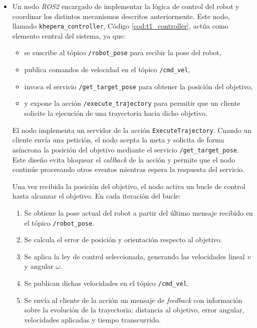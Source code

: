 \begin{itemize}
    Para realizar la solicitud de la acción desde terminal, 
    ejecutar el Código \ref{cod:actionClient}. En dicho código 
    aparece tanto la llamada indicando una posición como sin indicarla, en 
    la que es suficiente con establecer el valor de cualquiera de los campos 
    a ``nan'' para que obtenga mediante el servicio la posición del objeto como punto de destino.

    \item Un nodo \textit{ROS2} encargado de implementar la lógica de control del robot y 
coordinar los distintos mecanismos descritos anteriormente. Este nodo, llamado 
\texttt{khepera\_controller}, Código \ref{cod:t1_controller}, actúa como elemento central del sistema, ya que:

\begin{itemize}
    \item se suscribe al tópico \texttt{/robot\_pose} para recibir la pose del robot,
    \item publica comandos de velocidad en el tópico \texttt{/cmd\_vel},
    \item invoca el servicio \texttt{/get\_target\_pose} para obtener la posición del objetivo,
    \item y expone la acción \texttt{/execute\_trajectory} para permitir que un cliente
    solicite la ejecución de una trayectoria hacia dicho objetivo.
\end{itemize}

El nodo implementa un servidor de la acción \texttt{ExecuteTrajectory}. Cuando un 
cliente envía una petición, el nodo acepta la meta y solicita de forma asíncrona 
la posición del objetivo mediante el servicio \texttt{/get\_target\_pose}. Este 
diseño evita bloquear el \textit{callback} de la acción y permite que el nodo 
continúe procesando otros eventos mientras espera la respuesta del servicio.

Una vez recibida la posición del objetivo, el nodo activa un bucle de control 
hasta alcanzar el objetivo. En cada iteración del bucle:

\begin{enumerate}
    \item Se obtiene la pose actual del robot a partir del último mensaje recibido 
    en el tópico \texttt{/robot\_pose}.
    \item Se calcula el error de posición y orientación respecto al objetivo.
    \item Se aplica la ley de control seleccionada, generando las velocidades lineal \(v\) y angular \(\omega\).
    \item Se publican dichas velocidades en el tópico \texttt{/cmd\_vel}.
    \item Se envía al cliente de la acción un mensaje de \textit{feedback} con 
    información sobre la evolución de la trayectoria: distancia al objetivo, 
    error angular, velocidades aplicadas y tiempo transcurrido.
\end{enumerate}


\end{itemize}

